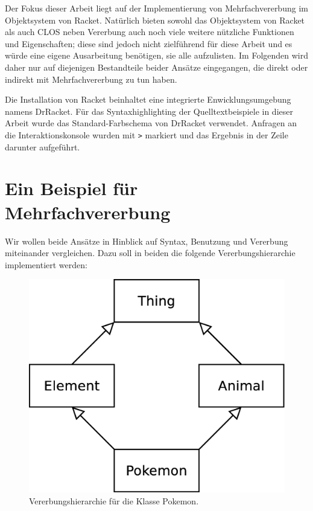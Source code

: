 Der Fokus dieser Arbeit liegt auf der Implementierung von Mehrfachvererbung im Objektsystem von Racket. Natürlich bieten sowohl das Objektsystem von Racket als auch CLOS neben Vererbung auch noch viele weitere nützliche Funktionen und Eigenschaften; diese sind jedoch nicht zielführend für diese Arbeit und es würde eine eigene Ausarbeitung benötigen, sie alle aufzulisten. Im Folgenden wird daher nur auf diejenigen Bestandteile beider Ansätze eingegangen, die direkt oder indirekt mit Mehrfachvererbung zu tun haben. 

Die Installation von Racket beinhaltet eine integrierte Enwicklungsumgebung namens DrRacket. Für das Syntaxhighlighting der Quelltextbeispiele in dieser Arbeit wurde das Standard-Farbschema von DrRacket verwendet. Anfragen an die Interaktionskonsole wurden mit \texttt{>} markiert und das Ergebnis in der Zeile darunter aufgeführt. 

\section{Ein Beispiel für Mehrfachvererbung} 

Wir wollen beide Ansätze in Hinblick auf Syntax, Benutzung und Vererbung miteinander vergleichen. Dazu soll in beiden die folgende Vererbungshierarchie implementiert werden:

\begin{figure}[h]
 \centering
 \includegraphics[scale=0.3]{pictures/pokemon}
 \caption{Vererbungshierarchie für die Klasse Pokemon.}
 \label{pokemon}
\end{figure}

